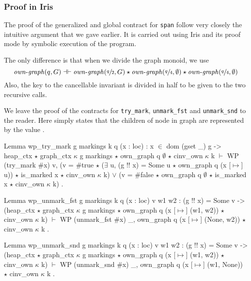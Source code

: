 \documentclass[]{scrartcl}
\def\MyMLe{\lstinline[language=MyML, basicstyle=\small\ttfamily, mathescape=true]}
\newcommand{\localgr}{\mathit{own\text{-}graph}}
\begin{document}
\subsubsection{Proof in Iris}
The proof of the generalized and global contract for
\MyMLe{span} follow very closely the intuitive argument that we gave earlier.
It is carried out using Iris and its proof mode
by symbolic execution of the program.

The only difference is that when we divide the
graph monoid, we use
\[
\localgr(q, G) \dashv\vdash \localgr(\sfrac{q}{2}, G) \star \localgr(\sfrac{q}{4},\emptyset) \star \localgr(\sfrac{q}{4},\emptyset)
\]
Also, the key to the cancellable invariant is divided in half
to be given to the two recursive calls.

We leave the proof of the contracts for
\MyMLe{try_mark},
\MyMLe{unmark_fst} and \MyMLe{unmark_snd}
to the reader.
Here  simply states that the children of node 
in graph  are represented by the value .
\begin{Coq}
Lemma wp_try_mark g markings k q (x : loc) : x $\in$ dom (gset _) g ->
    heap_ctx $\star$ graph_ctx $\kappa$ g markings $\star$ own_graph q $\emptyset$
     $\star$ cinv_own $\kappa$ k
    $\vdash$ WP (try_mark $\#$x) {{ v,
         (v = $\#$true $\star$ ($\exists$ u, (g !! x) = Some u $\star$ own_graph q (x [$\mapsto$] u))
          $\star$ is_marked x $\star$ cinv_own $\kappa$ k)
           $\lor$ (v = $\#$false $\star$ own_graph q $\emptyset$ $\star$ is_marked x
              $\star$ cinv_own $\kappa$ k) }}.
\end{Coq}

\begin{Coq}
Lemma wp_unmark_fst g markings k q (x : loc) v w1 w2 :
    (g !! x) = Some v ->
    (heap_ctx $\star$ graph_ctx $\kappa$ g markings
     $\star$ own_graph q (x [$\mapsto$] (w1, w2)) $\star$ cinv_own $\kappa$ k) $\vdash$
      WP (unmark_fst $\#$x)
      {{ _, own_graph q (x [$\mapsto$] (None, w2)) $\star$ cinv_own $\kappa$ k }}.
\end{Coq}

\begin{Coq}
Lemma wp_unmark_snd g markings k q (x : loc) v w1 w2 :
    (g !! x) = Some v ->
    (heap_ctx $\star$ graph_ctx $\kappa$ g markings
    $\star$ own_graph q (x [$\mapsto$] (w1, w2)) $\star$ cinv_own $\kappa$ k) $\vdash$
      WP (unmark_snd $\#$x)
      {{ _, own_graph q (x [$\mapsto$] (w1, None)) $\star$ cinv_own $\kappa$ k }}.
\end{Coq}
\end{document}
